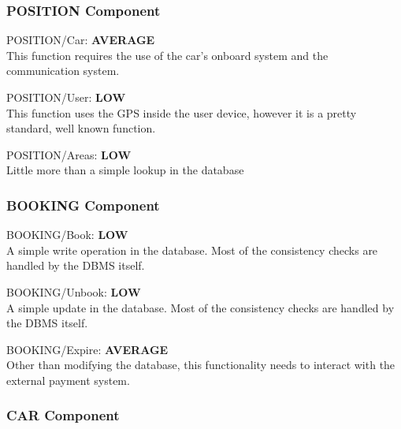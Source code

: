 \documentclass[11pt]{article} %
\newcommand{\extInput}[3]{ #1:  \textbf{#2} \\ #3  }
\begin{document}
\subsubsection{POSITION Component}

\begin{description}
	\item \extInput
		{POSITION/Car}
		{AVERAGE}
		{This function requires the use of the car's onboard system and the communication system.}
	\item \extInput
		{POSITION/User}
		{LOW}
		{This function uses the GPS inside the user device, however it is a pretty standard, well known function.}
	\item \extInput
		{POSITION/Areas}
		{LOW}
		{Little more than a simple lookup in the database}
\end{description}

\subsubsection{BOOKING Component}

\begin{description}
	\item \extInput
		{BOOKING/Book}
		{LOW}
		{A simple write operation in the database. Most of the consistency checks are handled by the DBMS itself.}
	\item \extInput
		{BOOKING/Unbook}
		{LOW}
		{A simple update in the database. Most of the consistency checks are handled by the DBMS itself.}
	\item \extInput
		{BOOKING/Expire}
		{AVERAGE}
		{Other than modifying the database, this functionality needs to interact with the external payment system.}
\end{description}

\subsubsection{CAR Component}
\end{document}

